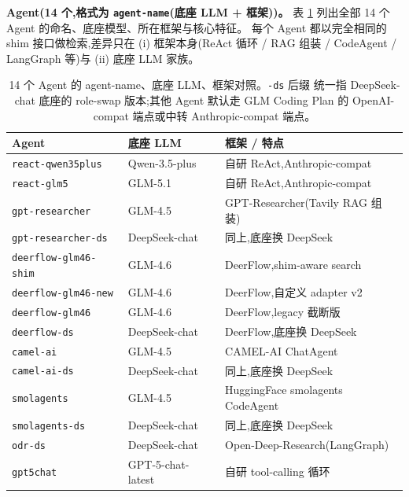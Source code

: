 \documentclass[UTF8,11pt]{ctexart}
\begin{document}
\textbf{Agent(14 个,格式为 \texttt{agent-name}(底座 LLM + 框架))。}
表 \ref{tab:agents} 列出全部 14 个 Agent 的命名、底座模型、所在框架与核心特征。
每个 Agent 都以完全相同的 shim 接口做检索,差异只在 (i) 框架本身(ReAct 循环 /
RAG 组装 / CodeAgent / LangGraph 等)与 (ii) 底座 LLM 家族。
\begin{table}[h]
  \centering
  \small
  \begin{tabular}{lll}
    \toprule
    Agent & 底座 LLM & 框架 / 特点 \\
    \midrule
    \texttt{react-qwen35plus}     & Qwen-3.5-plus     & 自研 ReAct,Anthropic-compat \\
    \texttt{react-glm5}           & GLM-5.1           & 自研 ReAct,Anthropic-compat \\
    \texttt{gpt-researcher}       & GLM-4.5           & GPT-Researcher(Tavily RAG 组装)\\
    \texttt{gpt-researcher-ds}    & DeepSeek-chat     & 同上,底座换 DeepSeek \\
    \texttt{deerflow-glm46-shim}  & GLM-4.6           & DeerFlow,shim-aware search \\
    \texttt{deerflow-glm46-new}   & GLM-4.6           & DeerFlow,自定义 adapter v2 \\
    \texttt{deerflow-glm46}       & GLM-4.6           & DeerFlow,legacy 截断版 \\
    \texttt{deerflow-ds}          & DeepSeek-chat     & DeerFlow,底座换 DeepSeek \\
    \texttt{camel-ai}             & GLM-4.5           & CAMEL-AI ChatAgent \\
    \texttt{camel-ai-ds}          & DeepSeek-chat     & 同上,底座换 DeepSeek \\
    \texttt{smolagents}           & GLM-4.5           & HuggingFace smolagents CodeAgent \\
    \texttt{smolagents-ds}        & DeepSeek-chat     & 同上,底座换 DeepSeek \\
    \texttt{odr-ds}               & DeepSeek-chat     & Open-Deep-Research(LangGraph) \\
    \texttt{gpt5chat}             & GPT-5-chat-latest & 自研 tool-calling 循环 \\
    \bottomrule
  \end{tabular}
  \caption{14 个 Agent 的 agent-name、底座 LLM、框架对照。\texttt{-ds} 后缀
    统一指 DeepSeek-chat 底座的 role-swap 版本;其他 Agent 默认走 GLM
    Coding Plan 的 OpenAI-compat 端点或中转 Anthropic-compat 端点。}
  \label{tab:agents}
\end{table}
\end{document}
